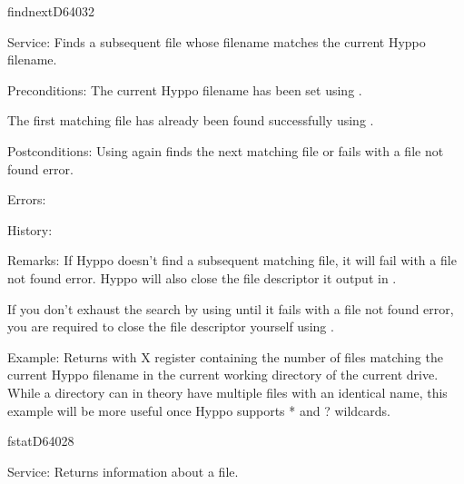 %
\newpage
\begin{hyppotrap}{findnext}{D640}{32}
\item [Service:]
  Finds a subsequent file whose filename matches the current Hyppo filename.
\item [Preconditions:]
  The current Hyppo filename has been set using .

  The first matching file has already been found successfully using
  .
\item [Postconditions:]
  Using  again finds the next matching file or fails with a
  file not found error.
\item [Errors:]
\item [History:]
\item [Remarks:]
  If Hyppo doesn't find a subsequent matching file, it will fail with a
  file not found error. Hyppo will also close the file descriptor it
  output in .

  If you don't exhaust the search by using  until it fails
  with a file not found error, you are required to close the file descriptor
  yourself using .
\item [Example:]
  Returns with X register containing the number of files matching the current
  Hyppo filename in the current working directory of the current drive. While
  a directory can in theory have multiple files with an identical name, this
  example will be more useful once Hyppo supports * and ? wildcards.
\end{hyppotrap}


\newpage
\begin{hyppotrap}{fstat}{D640}{28}
\item [Service:]
  Returns information about a file.
\notimplemented
\end{hyppotrap}


